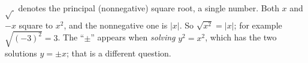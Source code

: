 $\sqrt{\ }$ denotes the principal (nonnegative) square root, a single number. Both $x$ and $-x$ square to $x^2$, and the nonnegative one is $|x|$. So $\sqrt{x^2}=\boxed{|x|}$; for example $\sqrt{(-3)^2}=3$. The ``$\pm$'' appears when \emph{solving} $y^2=x^2$, which has the two solutions $y=\pm x$; that is a different question.
